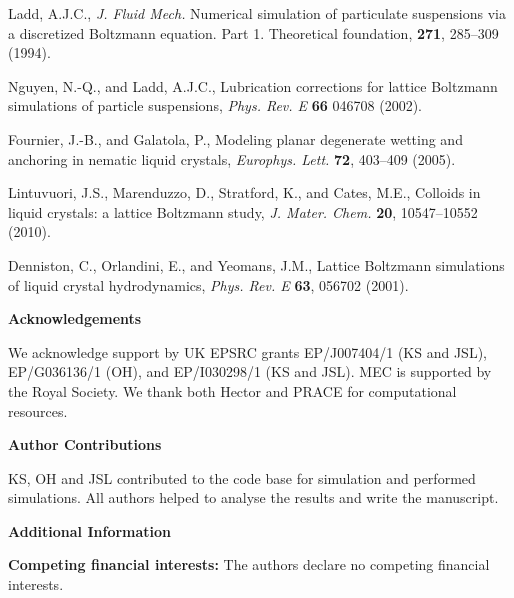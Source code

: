 \documentclass[12pt]{article}
\begin{document}
\begin{thebibliography}{99}
Ladd, A.J.C.,
\textit{J. Fluid Mech.} Numerical simulation of particulate suspensions via a
discretized Boltzmann equation. Part 1. Theoretical foundation,
\textbf{271}, 285--309 (1994).

Nguyen, N.-Q., and Ladd, A.J.C.,
Lubrication corrections for lattice Boltzmann simulations of particle
suspensions,
\textit{Phys. Rev. E} \textbf{66} 046708 (2002).

Fournier, J.-B., and  Galatola, P.,
Modeling planar degenerate wetting and anchoring in nematic liquid
crystals,
\textit{Europhys. Lett.} \textbf{72}, 403--409 (2005).

Lintuvuori, J.S., Marenduzzo, D., Stratford, K., and Cates, M.E.,
Colloids in liquid crystals: a lattice Boltzmann study,
\textit{J. Mater. Chem.} \textbf{20}, 10547--10552 (2010).

Denniston, C.,  Orlandini, E., and  Yeomans, J.M.,
Lattice Boltzmann simulations of liquid crystal hydrodynamics,
\textit{Phys. Rev. E} \textbf{63}, 056702 (2001).


\end{thebibliography}
\noindent
\textbf{\large Acknowledgements}

\noindent
We acknowledge support by UK EPSRC grants EP/J007404/1 (KS and JSL), 
EP/G036136/1 (OH), and EP/I030298/1 (KS and JSL).
MEC is supported by the Royal Society.
We thank both Hector and PRACE for computational resources.

\bigskip
\noindent
\textbf{\large Author Contributions}

\noindent
KS, OH and JSL contributed to the code base for simulation and performed
simulations. All authors helped to analyse the results and write the
manuscript.

\bigskip
\noindent
\textbf{\large Additional Information}

\noindent
\textbf{Competing financial interests:} The authors declare no competing
financial interests.

\newpage
\end{document}
